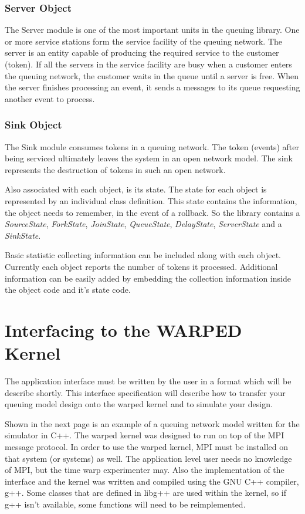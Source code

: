 \documentclass[11pt]{report}
\begin{document}
\subsection{Server Object}

The Server module is one of the most important units in the queuing
library.  One or more service stations form the service facility of the
queuing network.  The server is an entity capable of producing the
required service to the customer (token).  If all the servers in the
service facility are busy when a customer enters the queuing network,
the customer waits in the queue until a server is free.  When the server
finishes processing an event, it sends a messages to its queue
requesting another event to process.

\subsection{Sink Object}

The Sink module consumes tokens in a queuing network.  The token
(events) after being serviced ultimately leaves the system in an open
network model.  The sink represents the destruction of tokens in such an
open network.

Also associated with each object, is its state.  The state for each
object is represented by an individual class definition.  This state
contains the information, the object needs to remember, in the event of
a rollback.  So the library contains a {\it SourceState}, {\it ForkState},
{\it JoinState}, {\it QueueState}, {\it DelayState}, {\it ServerState} and
a {\it SinkState}. 

Basic statistic collecting information can be included along with each
object.  Currently each object reports the number of tokens it
processed.  Additional information can be easily added by embedding the
collection information inside the object code and it's state code.
 
\chapter{Interfacing to the WARPED Kernel}

The application interface must be written by the user in a format which
will be describe shortly.  This interface specification will describe
how to transfer your queuing model design onto the warped kernel and to
simulate your design.

Shown in the next page is an example of a queuing network model written
for the simulator in C++.  The warped kernel was designed to run on top
of the MPI message protocol.  In order to use the warped kernel, MPI
must be installed on that system (or systems) as well.  The application
level user needs no knowledge of MPI, but the time warp experimenter
may.  Also the implementation of the interface and the kernel was
written and compiled using the GNU C++ compiler, g++.  Some classes that
are defined in libg++ are used within the kernel, so if g++ isn't
available, some functions will need to be reimplemented.
\end{document}
